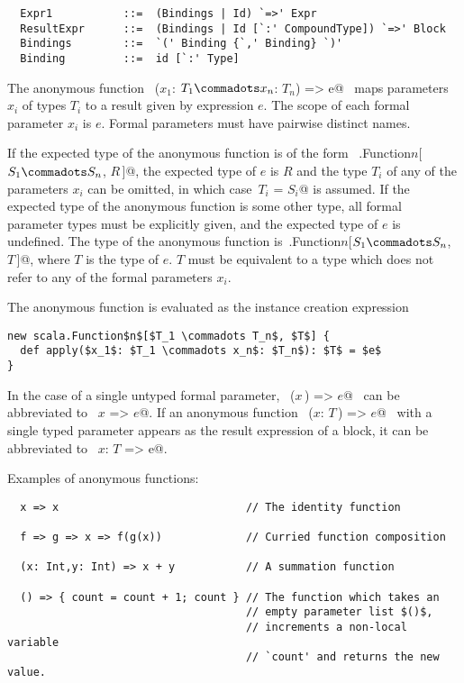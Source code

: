 \syntax\begin{lstlisting}
  Expr1           ::=  (Bindings | Id) `=>' Expr
  ResultExpr      ::=  (Bindings | Id [`:' CompoundType]) `=>' Block
  Bindings        ::=  `(' Binding {`,' Binding} `)'
  Binding         ::=  id [`:' Type]
\end{lstlisting}

The anonymous function ~\lstinline@($x_1$: $T_1 \commadots x_n$: $T_n$) => e@~ 
maps parameters $x_i$ of types $T_i$ to a result given
by expression $e$. The scope of each formal parameter
$x_i$ is $e$. Formal parameters must have pairwise distinct names.

If the expected type of the anonymous function is of the form
~\lstinline@scala.Function$n$[$S_1 \commadots S_n$, $R\,$]@, the
expected type of $e$ is $R$ and the type $T_i$ of any of the
parameters $x_i$ can be omitted, in which
case~\lstinline@$T_i$ = $S_i$@ is assumed.
If the expected type of the anonymous function is
some other type, all formal parameter types must be explicitly given,
and the expected type of $e$ is undefined. The type of the anonymous
function
is~\lstinline@scala.Function$n$[$S_1 \commadots S_n$, $T\,$]@,
where $T$ is the type of $e$. $T$ must be equivalent to a
type which does not refer to any of the formal parameters $x_i$.

The anonymous function is evaluated as the instance creation expression
\begin{lstlisting}
new scala.Function$n$[$T_1 \commadots T_n$, $T$] {
  def apply($x_1$: $T_1 \commadots x_n$: $T_n$): $T$ = $e$
}
\end{lstlisting}
In the case of a single untyped formal parameter, 
~\lstinline@($x\,$) => $e$@~ 
can be abbreviated to ~\lstinline@$x$ => $e$@. If an
anonymous function ~\lstinline@($x$: $T\,$) => $e$@~ with a single
typed parameter appears as the result expression of a block, it can be
abbreviated to ~\lstinline@$x$: $T$ => e@.

\example Examples of anonymous functions:

\begin{lstlisting}
  x => x                             // The identity function

  f => g => x => f(g(x))             // Curried function composition

  (x: Int,y: Int) => x + y           // A summation function

  () => { count = count + 1; count } // The function which takes an
                                     // empty parameter list $()$, 
                                     // increments a non-local variable 
                                     // `count' and returns the new value.
\end{lstlisting}

